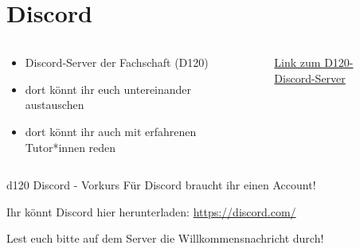 \section{Discord}
\begin{frame}[c]
    \slidehead
    \begin{columns}[c]
        \begin{column}{.6\linewidth}
            \begin{itemize}
                \item Discord-Server der Fachschaft (D120)
                \item dort könnt ihr euch untereinander austauschen
                \item dort könnt ihr auch mit erfahrenen Tutor*innen reden
            \end{itemize}
        \end{column}%
        \begin{column}{.4\linewidth}
            \begin{figure}
                \centering\mbox{}
                \caption{\href{https://discord.gg/GBj9rvszDT}{Link zum D120-Discord-Server}}
            \end{figure}
        \end{column}
    \end{columns}
    \begin{block}{d120 Discord - Vorkurs}
        Für Discord braucht ihr einen Account!

        Ihr könnt Discord hier herunterladen: \url{https://discord.com/}

        Lest euch bitte auf dem Server die Willkommensnachricht durch!
    \end{block}
\end{frame}


